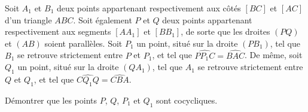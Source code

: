 Soit $A_1$ et $B_1$ deux points appartenant respectivement aux côtés $[BC]$ et $[AC]$ d'un triangle $ABC$.
Soit également $P$ et $Q$ deux points appartenant respectivement aux segments $[AA_1]$ et $[BB_1]$, de sorte
que les droites $(PQ)$ et $(AB)$ soient parallèles. Soit $P_1$ un point, situé sur la droite $(PB_1)$, tel que
$B_1$ se retrouve strictement entre $P$ et $P_1$, et tel que $\widehat{PP_1C} = \widehat{BAC}$. De même, soit
$Q_1$ un point, situé sur la droite $(QA_1)$, tel que $A_1$ se retrouve strictement entre $Q$ et $Q_1$, et tel
que $\widehat{CQ_1Q} = \widehat{CBA}$.

Démontrer que les points $P$, $Q$, $P_1$ et $Q_1$ sont cocycliques.
